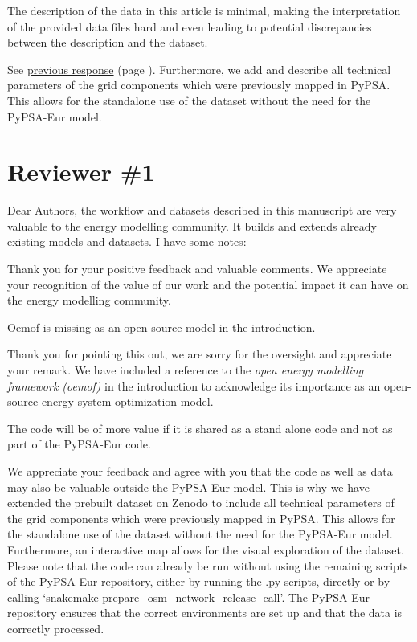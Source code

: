 \documentclass{response}
\begin{document}
\EC The description of the data in this article is minimal, making the interpretation of the provided data files hard and even leading to potential discrepancies between the description and the dataset. 

\AR See \hyperref[ac:datarecords]{previous response} (page \pageref{ac:datarecords}). Furthermore, we add and describe all technical parameters of the grid components which were previously mapped in PyPSA. This allows for the standalone use of the dataset without the need for the PyPSA-Eur model.

\section*{Reviewer \#1}

\RC Dear Authors, the workflow and datasets described in this manuscript are very valuable to the energy modelling community. It builds and extends already existing models and datasets. I have some notes: 

\AR Thank you for your positive feedback and valuable comments. We appreciate your recognition of the value of our work and the potential impact it can have on the energy modelling community. 

\RC Oemof is missing as an open source model in the introduction.

\AR Thank you for pointing this out, we are sorry for the oversight and appreciate your remark. We have included a reference to the \textit{open energy modelling framework (oemof)} \cite{hilpertOpenEnergyModelling2018} in the introduction to acknowledge its importance as an open-source energy system optimization model. 

\RC The code will be of more value if it is shared as a stand alone code and not as part of the PyPSA-Eur code. 

\AR We appreciate your feedback and agree with you that the code as well as data may also be valuable outside the PyPSA-Eur model. This is why we have extended the prebuilt dataset on Zenodo \cite{xiongPrebuiltElectricityNetwork2024} to include all technical parameters of the grid components which were previously mapped in PyPSA. This allows for the standalone use of the dataset without the need for the PyPSA-Eur model. Furthermore, an interactive map allows for the visual exploration of the dataset. Please note that the code can already be run without using the remaining scripts of the PyPSA-Eur repository, either by running the .py scripts, directly or by calling `snakemake prepare\_osm\_network\_release -call'. The PyPSA-Eur repository ensures that the correct environments are set up and that the data is correctly processed.
\end{document}
